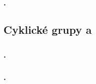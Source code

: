 \documentclass[10pt,a4paper]{article}
\begin{document}
\subsubsection{.}


\subsection{Cyklické grupy a }

\subsubsection{.}
\subsubsection{.}
\end{document}
